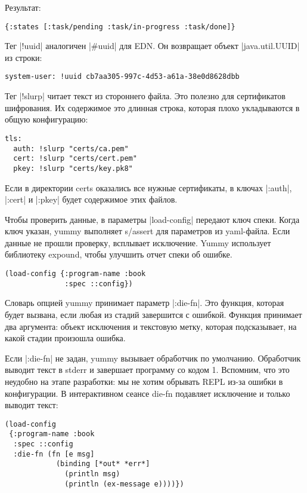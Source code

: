 Результат:

\begin{verbatim}
{:states [:task/pending :task/in-progress :task/done]}
\end{verbatim}

Тег \spverb|!uuid| аналогичен \spverb|#uuid| для EDN. Он возвращает объект
\spverb|java.util.UUID| из строки:

\begin{verbatim}
system-user: !uuid cb7aa305-997c-4d53-a61a-38e0d8628dbb
\end{verbatim}

Тег \spverb|!slurp| читает текст из стороннего файла. Это полезно для сертификатов
шифрования. Их содержимое это длинная строка, которая плохо укладываются в общую
конфигурацию:

\begin{verbatim}
tls:
  auth: !slurp "certs/ca.pem"
  cert: !slurp "certs/cert.pem"
  pkey: !slurp "certs/key.pk8"
\end{verbatim}

Если в директории certs оказались все нужные сертификаты, в ключах \spverb|:auth|,
\spverb|:cert| и \spverb|:pkey| будет содержимое этих файлов.

Чтобы проверить данные, в параметры \spverb|load-config| передают ключ спеки. Когда
ключ указан, yummy выполняет s/assert для параметров из yaml-файла. Если данные
не прошли проверку, всплывает исключение. Yummy использует библиотеку expound,
чтобы улучшить отчет спеки об ошибке.

\begin{verbatim}
(load-config {:program-name :book
              :spec ::config})
\end{verbatim}

Словарь опцией yummy принимает параметр \spverb|:die-fn|. Это функция, которая будет
вызвана, если любая из стадий завершится с ошибкой. Функция принимает два
аргумента: объект исключения и текстовую метку, которая подсказывает, на какой
стадии произошла ошибка.

Если \spverb|:die-fn| не задан, yummy вызывает обработчик по умолчанию. Обработчик
выводит текст в stderr и завершает программу со кодом 1. Вспомним, что это
неудобно на этапе разработки: мы не хотим обрывать REPL из-за ошибки в
конфигурации. В интерактивном сеансе die-fn подавляет исключение и только
выводит текст:

\begin{verbatim}
(load-config
 {:program-name :book
  :spec ::config
  :die-fn (fn [e msg]
            (binding [*out* *err*]
              (println msg)
              (println (ex-message e))))})
\end{verbatim}

